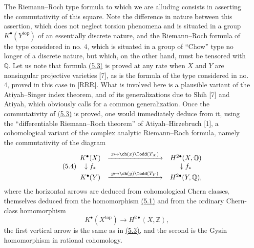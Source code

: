 The Riemann--Roch type formula to which we are alluding consists in asserting the commutativity of this square. Note the difference in nature between this assertion, which does not neglect torsion phenomena and is situated in a group $K^\bullet(Y^{\mathrm{top}})$ of an essentially discrete nature, and the Riemann--Roch formula of the type considered in no. 4, which is situated in a group of ``Chow'' type no longer of a discrete nature, but which, on the other hand, must be tensored with $\mathbb Q$. Let us note that formula \hyperlink{sga6.e00.eq.5-3}{(5.3)} is proved at any rate when $X$ and $Y$ are nonsingular projective varieties [7], as is the formula of the type considered in no. 4, proved in this case in [RRR]. What is involved here is a plausible variant of the Atiyah--Singer index theorem, and of its generalizations due to Shih [7] and Atiyah, which obviously calls for a common generalization. Once the commutativity of \hyperlink{sga6.e00.eq.5-3}{(5.3)} is proved, one would immediately deduce from it, using the ``differentiable Riemann--Roch theorem'' of Atiyah--Hirzebruch [1], a cohomological variant of the complex analytic Riemann--Roch formula, namely the commutativity of the diagram
\begin{equation}\tag{5.4}
\begin{array}{ccc}
K^\bullet(X) & \xrightarrow{\;x\mapsto \ch(x)\Todd(T_X)\;} & H^{2\bullet}(X,\mathbb Q) \\
\downarrow f_* && \downarrow f_* \\
K^\bullet(Y) & \xrightarrow{\;y\mapsto \ch(y)\Todd(T_Y)\;} & H^{2\bullet}(Y,\mathbb Q),
\end{array}
\end{equation}
where the horizontal arrows are deduced from cohomological Chern classes, themselves deduced from the homomorphism \hyperlink{sga6.e00.eq.5-1}{(5.1)} and from the ordinary Chern-class homomorphism
\[
K^\bullet(X^{\mathrm{top}})\longrightarrow H^{2\bullet}(X,\mathbb Z),
\]
the first vertical arrow is the same as in \hyperlink{sga6.e00.eq.5-3}{(5.3)}, and the second is the Gysin homomorphism in rational cohomology.

